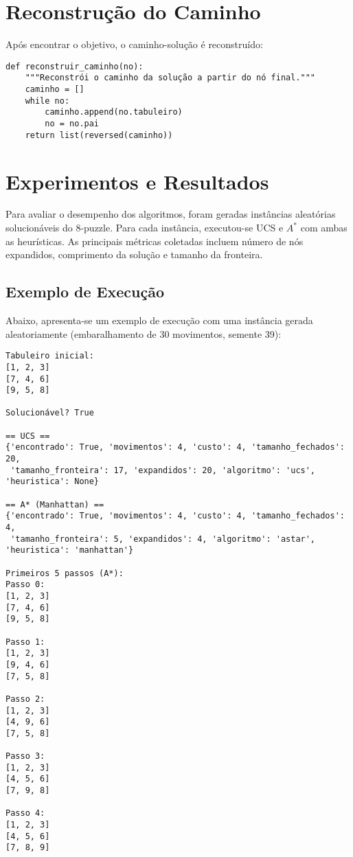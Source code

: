 \section{Reconstrução do Caminho}  
  
Após encontrar o objetivo, o caminho-solução é reconstruído:  
  
\begin{verbatim}  
def reconstruir_caminho(no):  
    """Reconstrói o caminho da solução a partir do nó final."""  
    caminho = []  
    while no:  
        caminho.append(no.tabuleiro)  
        no = no.pai  
    return list(reversed(caminho))  
\end{verbatim}  
  
\section{Experimentos e Resultados}  
  
Para avaliar o desempenho dos algoritmos, foram geradas instâncias aleatórias solucionáveis do 8-puzzle. Para cada instância, executou-se UCS e $A^*$ com ambas as heurísticas. As principais métricas coletadas incluem número de nós expandidos, comprimento da solução e tamanho da fronteira.  
  
\subsection{Exemplo de Execução}  
  
Abaixo, apresenta-se um exemplo de execução com uma instância gerada aleatoriamente (embaralhamento de 30 movimentos, semente 39):  
  
\begin{verbatim}  
Tabuleiro inicial:  
[1, 2, 3]  
[7, 4, 6]  
[9, 5, 8]  
  
Solucionável? True  
  
== UCS ==  
{'encontrado': True, 'movimentos': 4, 'custo': 4, 'tamanho_fechados': 20,  
 'tamanho_fronteira': 17, 'expandidos': 20, 'algoritmo': 'ucs', 'heuristica': None}  
  
== A* (Manhattan) ==  
{'encontrado': True, 'movimentos': 4, 'custo': 4, 'tamanho_fechados': 4,  
 'tamanho_fronteira': 5, 'expandidos': 4, 'algoritmo': 'astar', 'heuristica': 'manhattan'}  
  
Primeiros 5 passos (A*):  
Passo 0:  
[1, 2, 3]  
[7, 4, 6]  
[9, 5, 8]  
  
Passo 1:  
[1, 2, 3]  
[9, 4, 6]  
[7, 5, 8]  
  
Passo 2:  
[1, 2, 3]  
[4, 9, 6]  
[7, 5, 8]  
  
Passo 3:  
[1, 2, 3]  
[4, 5, 6]  
[7, 9, 8]  
  
Passo 4:  
[1, 2, 3]  
[4, 5, 6]  
[7, 8, 9]  
\end{verbatim}  
  

